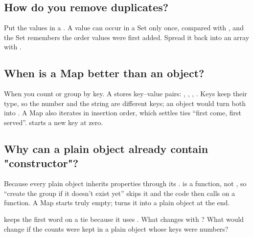 \label{ch:c08}

\subsection{How do you remove duplicates?}%
Put the values in a . A value can occur in a Set only once, compared with \code{===}, and the Set remembers the order values were first added. Spread it back into an array with \code{[...set]}.

\subsection{When is a Map better than an object?}%
When you count or group by key. A  stores key--value pairs: , , , . Keys keep their type, so the number  and the string  are different keys; an object would turn both into . A Map also iterates in insertion order, which settles ties ``first come, first served''.  starts a new key at zero.

\subsection{Why can a plain object already contain "constructor"?}%
Because every plain object inherits properties through its . \code{\{\}["constructor"]} is a function, not , so ``create the group if it doesn't exist yet'' skips it and the code then calls  on a function. A Map starts truly empty;  turns it into a plain object at the end.

\begin{ponder} keeps the first word on a tie because it uses \code{>}. What changes with \code{>=}? What would change if the counts were kept in a plain object whose keys were numbers?\end{ponder}

